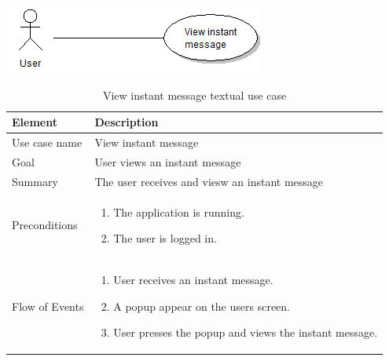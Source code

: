 \begin{table}
\begin{center}
\begin{center}
\includegraphics[width=\textwidth]{view_instant_message}
\end{center}
\begin{tabular}{p{3cm}|p{12cm}} \hline
Element & Description \\ \hline
Use case name & View instant message \\
Goal & User views an instant message \\
Summary & The user receives and viesw an instant message \\
Preconditions &
\begin{enumerate}
\item{}The application is running.
\item{}The user is logged in.
\end{enumerate} \\ \hline
Flow of Events &
\begin{enumerate}
\item{}User receives an instant message.
\item{}A popup appear on the users screen.
\item{}User presses the popup and views the instant message.
\end{enumerate} \\ \hline
\end{tabular}
\end{center}
\caption{View instant message textual use case} \label{tab:createmessage}
\end{table}

